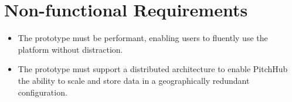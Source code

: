 \section{Non-functional Requirements}
\begin{itemize}
\item The prototype must be performant, enabling users to fluently use the platform without distraction.
\item The prototype must support a distributed architecture to enable PitchHub the ability to scale and store data in a geographically redundant configuration.
\end{itemize}
